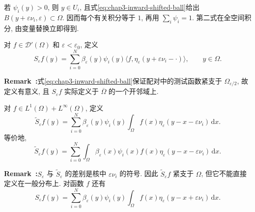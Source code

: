 \begin{Proof}
若 $\psi_i(y)>0$, 则 $y\in U_i$, 且式\eqref{eq:chap3-inward-shifted-ball}给出 $B(y+\varepsilon\nu_i,\varepsilon)\subset\Omega$. 因而每个有关积分等于 $1$, 再用 $\sum_i\psi_i=1$. 第二式在全空间积分, 由变量替换立即得到.
\end{Proof}

\begin{Definition}
\label{def:chap3-inward-mollifier}
对 $f\in\mathcal D'(\Omega)$ 和 $\varepsilon<\varepsilon_0$, 定义
\begin{equation}
 S_\varepsilon f(y)=\sum_{i=0}^N\beta_\varepsilon(y)\psi_i(y)
 \langle f,\eta_\varepsilon(y+\varepsilon\nu_i-\cdot)\rangle,
 \qquad y\in\Omega.
 \label{eq:chap3-inward-mollifier}
\end{equation}
\end{Definition}

\par\noindent{}\textbf{Remark~\thechapterthreesectiontworemark:}\label{rem:chap3-inward-mollifier-definition}\quad 式\eqref{eq:chap3-inward-shifted-ball}保证配对中的测试函数紧支于 $\Omega_{\varepsilon/2}$, 故定义有意义, 且 $S_\varepsilon f$ 实际定义于 $\overline\Omega$ 的一个开邻域上.

\begin{Definition}
\label{def:chap3-outward-mollifier}
对 $f\in L^1(\Omega)+L^\infty(\Omega)$, 定义
\[
 \widetilde S_\varepsilon f(y)=\sum_{i=0}^N\beta_\varepsilon(y)\psi_i(y)
 \int_\Omega f(x)\eta_\varepsilon(y-x-\varepsilon\nu_i)\,\mathrm dx.
\]
等价地,
\begin{equation}
 \widetilde S_\varepsilon f(y)=\sum_{i=0}^N\int_\Omega
 \beta_\varepsilon(x)\psi_i(x)f(x)\eta_\varepsilon(y-x-\varepsilon\nu_i)\,\mathrm dx.
 \label{eq:chap3-outward-mollifier}
\end{equation}
\end{Definition}

\par\noindent{}\textbf{Remark~\thechapterthreesectiontworemark:}\label{rem:chap3-mollifier-kernel-sign}\quad $S_\varepsilon$ 与 $\widetilde S_\varepsilon$ 的差别是核中 $\varepsilon\nu_i$ 的符号. 因此 $\widetilde S_\varepsilon f$ 紧支于 $\Omega$, 但它不能直接定义在一般分布上. 对函数 $f$ 还有
\begin{equation}
 S_\varepsilon f(y)=\sum_{i=0}^N\beta_\varepsilon(y)\psi_i(y)
 \int_\Omega f(x)\eta_\varepsilon(y-x+\varepsilon\nu_i)\,\mathrm dx.
 \label{eq:chap3-inward-mollifier-integral}
\end{equation}


